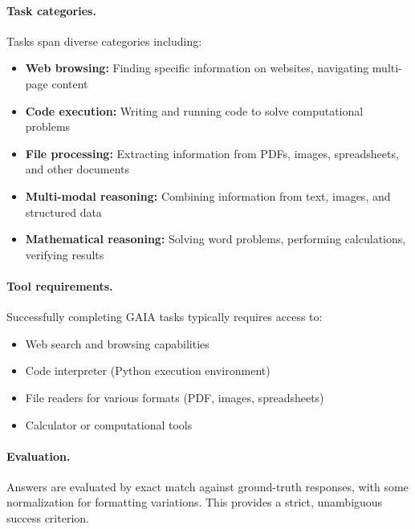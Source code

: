 \documentclass[11pt]{article}
\begin{document}
\paragraph{Task categories.}
Tasks span diverse categories including:
\begin{itemize}[leftmargin=*, topsep=2pt]
    \item \textbf{Web browsing:} Finding specific information on websites, navigating multi-page content
    \item \textbf{Code execution:} Writing and running code to solve computational problems
    \item \textbf{File processing:} Extracting information from PDFs, images, spreadsheets, and other documents
    \item \textbf{Multi-modal reasoning:} Combining information from text, images, and structured data
    \item \textbf{Mathematical reasoning:} Solving word problems, performing calculations, verifying results
\end{itemize}

\paragraph{Tool requirements.}
Successfully completing GAIA tasks typically requires access to:
\begin{itemize}[leftmargin=*, topsep=2pt]
    \item Web search and browsing capabilities
    \item Code interpreter (Python execution environment)
    \item File readers for various formats (PDF, images, spreadsheets)
    \item Calculator or computational tools
\end{itemize}

\paragraph{Evaluation.}
Answers are evaluated by exact match against ground-truth responses, with some normalization for formatting variations.
This provides a strict, unambiguous success criterion.
\end{document}
